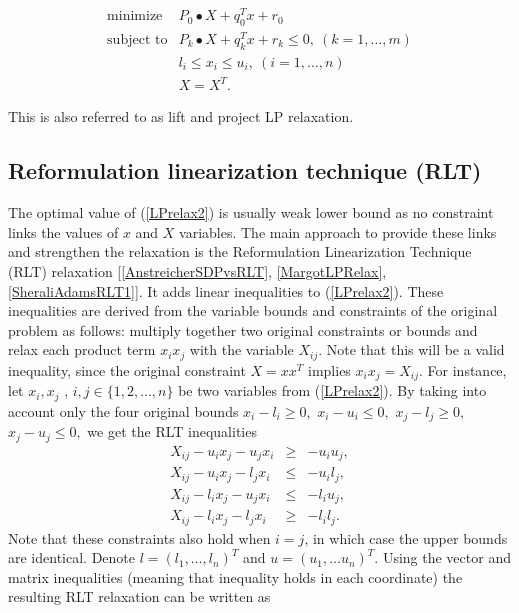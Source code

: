 \documentclass[12pt]{book}
\theoremstyle{definition}
\begin{document}
\begin{equation}
\label{LPrelax2} 
\begin{array}{ll}
\mbox{minimize}& P_0\bullet X + q_0^Tx + r_0\\
\mbox{subject to}& P_k\bullet X+ q_k^Tx + r_k \leq 0, \  (k = 1,\dots ,m)\\
 				& l_i\leq x_i \leq u_i, \ (i = 1,\dots ,n)\\
& X = X^T.
\end{array} 
\end{equation}

This is also referred to as lift and project LP relaxation. 

\subsection{Reformulation linearization technique (RLT)}
\label{SectionRLTinLP}

The optimal value of (\ref{LPrelax2}) is usually weak lower bound as no constraint links the values of $x$ and $X$ variables.
The main approach to provide these links and strengthen the relaxation is the Reformulation Linearization Technique (RLT) relaxation [\ref{AnstreicherSDPvsRLT}, \ref{MargotLPRelax}, \ref{SheraliAdamsRLT1}].
It adds linear inequalities to (\ref{LPrelax2}). These inequalities are derived from the variable bounds and 
constraints of the original problem as follows: multiply together two original constraints or bounds and relax 
each product term $x_ix_j$ with the variable $X_{ij}$. Note that this will be a valid inequality, since the original constraint $X=xx^T$ implies $x_ix_j = X_{ij}$. For instance, let $x_i, x_j$ , $i,j\in \{1, 2,\dots ,n\}$ be two variables from
(\ref{LPrelax2}). By taking into account only the four original bounds $x_i - l_i \geq 0,$ $x_i - u_i \leq 0 ,$ $ x_j - l_j \geq 0,$  $ x_j - u_j \leq 0,$ we get the RLT inequalities
\begin{equation}
\label{RLTConstraints}
\begin{array}{lcl}
X_{ij} - u_ix_j - u_jx_i  &\geq & -u_iu_j ,\\
X_{ij} - u_ix_j - l_jx_i  &\leq & -u_il_j ,\\
X_{ij} - l_ix_j - u_jx_i  &\leq & -l_iu_j ,\\
X_{ij} - l_ix_j - l_jx_i   &\geq & -l_il_j .
\end{array}
\end{equation}
 Note that these constraints also hold when $i = j$, in which case the upper bounds are identical. Denote $l = (l_1,\dots ,l_n)^T$ and $u = (u_1,\dots u_n)^T.$
 Using the vector and matrix inequalities (meaning that inequality holds in each coordinate) the resulting RLT relaxation can be written as 
 
\end{document}
